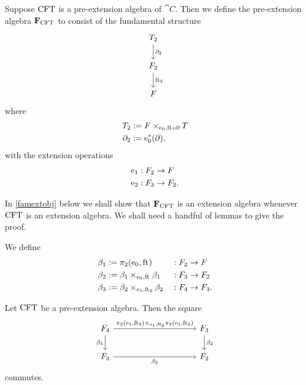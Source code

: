 \begin{defn}
Suppose $\mathrm{CFT}$ is a pre-extension algebra of $\cat{C}$. Then we define the pre-extension algebra
$\mathbf{F}_{\mathrm{CFT}}$ to consist of the fundamental structure
\begin{equation*}
\begin{tikzcd}
\stesyst_2
  \ar{d}{\ebd[2]}
  \\
\stesysf_2
  \ar{d}{\eft[2]}
  \\
\stesysf
\end{tikzcd}
\end{equation*}
where
\begin{align*}
\stesyst_2 
  & := \pullback{\stesysf}{\stesyst}{\ectxext}{\eft\circ\ebd}
  \\
\ebd[2]
  & := \ectxext^\ast(\ebd),
\end{align*}
with the extension operations
\begin{align*}
\mathrm{e}_{1} 
  & 
  : F_2\to F\\
\mathrm{e}_{2} & : F_3\to F_2.
\end{align*}
\end{defn}

In \autoref{famextobj} below we shall show that $\mathbf{F}_{\mathrm{CFT}}$ is an
extension algebra whenever $\mathrm{CFT}$ is an extension algebra. We shall need
a handful of lemmas to give the proof.

\begin{defn}
We define
\begin{align*}
\beta_1 
  & := 
\pullbackpr{2}{\ectxext}{\eft}
  & &
  : \stesysf_2\to\stesysf
  \\
\beta_2
  & :=
\pullback{\beta_1}{\beta_1}{\ectxext}{\eft}
  & &
  : \stesysf_3\to\stesysf_2
  \\
\beta_3
  & :=
\pullback{\beta_2}{\beta_2}{\efamext}{\eft[2]}
  & &
  : \stesysf_4\to\stesysf_3.
\end{align*}
\end{defn}

\begin{lem}
Let $\mathrm{CFT}$ be a pre-extension algebra. Then the square
\begin{equation*}
\begin{tikzcd}[column sep=10em]
\stesysf_4
  \ar{r}{\pullback{\pullbackpr{2}{\efamext}{\eft[2]}}{\pullbackpr{2}{\efamext}{\eft[2]}}{\efamext}{\eft[2]}}
  \ar{d}[swap]{\beta_3}
  &
\stesysf_3
  \ar{d}{\beta_2}
  \\
\stesysf_3
  \ar{r}[swap]{\beta_2}
  &
\stesysf_2
\end{tikzcd}
\end{equation*}
commutes.
\end{lem}

